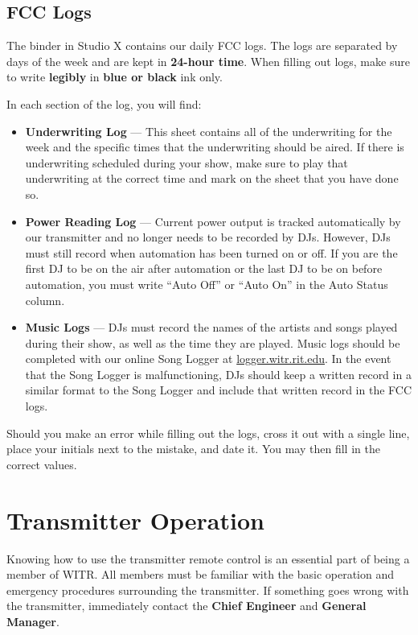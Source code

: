 \documentclass{witrman}
\begin{document}
\section{FCC Logs}
The binder in Studio X contains our daily FCC logs. The logs are separated by
days of the week and are kept in \textbf{24-hour time}. When filling out logs,
make sure to write \textbf{legibly} in \textbf{blue or black} ink only.

In each section of the log, you will find:
\begin{itemize}
    \item \textbf{Underwriting Log} --- This sheet contains all of the
        underwriting for the week and the specific times that the underwriting
        should be aired. If there is underwriting scheduled during your show,
        make sure to play that underwriting at the correct time and mark on the
        sheet that you have done so.
    \item \textbf{Power Reading Log} --- Current power output is tracked
        automatically by our transmitter and no longer needs to be recorded by
        DJs.  However, DJs must still record when automation has been turned on
        or off. If you are the first DJ to be on the air after automation or the
        last DJ to be on before automation, you must write ``Auto Off'' or
        ``Auto On'' in the Auto Status column.
    \item \textbf{Music Logs} --- DJs must record the names of the artists and
        songs played during their show, as well as the time they are played.
        Music logs should be completed with our online Song Logger at
        \href{http://logger.witr.rit.edu}{logger.witr.rit.edu}. In the event
        that the Song Logger is malfunctioning, DJs should keep a written record
        in a similar format to the Song Logger and include that written record
        in the FCC logs.
\end{itemize}

Should you make an error while filling out the logs, cross it out with a single
line, place your initials next to the mistake, and date it. You may then fill in
the correct values.

\chapter{Transmitter Operation}
Knowing how to use the transmitter remote control is an essential part of being
a member of WITR\@. All members must be familiar with the basic operation and
emergency procedures surrounding the transmitter. If something goes wrong with
the transmitter, immediately contact the \textbf{Chief Engineer} and
\textbf{General Manager}.
\end{document}
